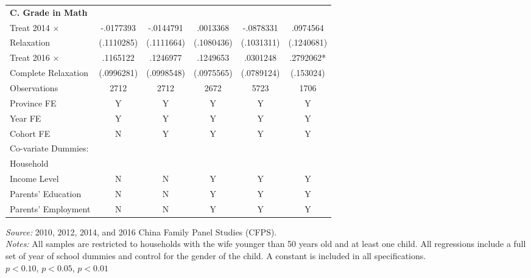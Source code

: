 \documentclass[12pt]{extarticle}
\begin{document}
\begin{table}
\begin{threeparttable}
\begin{tabular}{l*{5}{c}}
\textbf{C. Grade in Math} \\
Treat 2014 $\times$ &   -.0177393   &   -.0144791   &    .0013368   &   -.0878331   &    .0974564   \\
\quad 2014 Relaxation     &  (.1110285)   &  (.1111664)   &  (.1080436)   &  (.1031311)   &  (.1240681)   \\
Treat 2016 $\times$ &    .1165122   &    .1246977   &    .1249653   &    .0301248   &    .2792062*  \\
\quad Complete Relaxation &  (.0996281)   &  (.0998548)   &  (.0975565)   &  (.0789124)   &   (.153024)   \\
Observations        &        2712   &        2712   &        2672   &        5723   &        1706   \\
\hline
Province FE &  Y &  Y & Y & Y & Y \\
Year FE &  Y &  Y & Y & Y & Y \\
Cohort FE & N & Y & Y & Y & Y \\
Co-variate Dummies: \\
\quad Household \\
\qquad Income Level & N & N & Y & Y & Y \\
\quad Parents' Education &  N &  N & Y & Y & Y \\
\quad Parents' Employment &  N &  N & Y & Y & Y \\
\hline\hline
\end{tabular}
\begin{tablenotes}
\footnotesize \textit{Source:} 2010, 2012, 2014, and 2016 China Family Panel Studies (CFPS). \\
\textit{Notes:} All samples are restricted to households with the wife younger than 50 years old and at least one child. All regressions include a full set of year of school dummies and control for the gender of the child. A constant is included in all specifications. \\
\quad \sym{*} \(p<0.10\), \sym{**} \(p<0.05\), \sym{***} \(p<0.01\)
\end{tablenotes}
\end{threeparttable}
\end{table}
\end{document}
